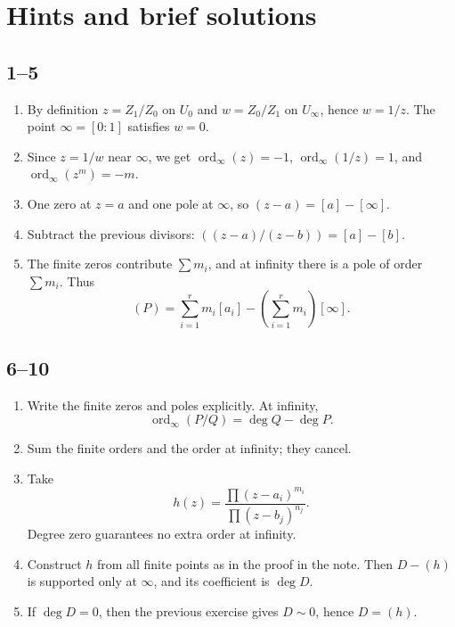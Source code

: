 \documentclass[11pt]{article}
\newcommand{\ord}{\operatorname{ord}}
\newcommand{\degd}{\operatorname{deg}}
\theoremstyle{definition}
\theoremstyle{plain}
\begin{document}
\section{Hints and brief solutions}
\subsection*{1--5}
\begin{enumerate}[label=\textbf{\arabic*.}, leftmargin=2.5em]
    \item By definition $z=Z_1/Z_0$ on $U_0$ and $w=Z_0/Z_1$ on $U_\infty$, hence $w=1/z$. The point $\infty=[0:1]$ satisfies $w=0$.
    \item Since $z=1/w$ near $\infty$, we get $\ord_{\infty}(z)=-1$, $\ord_{\infty}(1/z)=1$, and $\ord_{\infty}(z^m)=-m$.
    \item One zero at $z=a$ and one pole at $\infty$, so $(z-a)=[a]-[\infty]$.
    \item Subtract the previous divisors: $((z-a)/(z-b))=[a]-[b]$.
    \item The finite zeros contribute $\sum m_i$, and at infinity there is a pole of order $\sum m_i$. Thus
    \[
    (P)=\sum_{i=1}^r m_i[a_i]-\left(\sum_{i=1}^r m_i\right)[\infty].
    \]
\end{enumerate}

\subsection*{6--10}
\begin{enumerate}[label=\textbf{\arabic*.}, leftmargin=2.5em, start=6]
    \item Write the finite zeros and poles explicitly. At infinity,
    \[
    \ord_{\infty}(P/Q)=\deg Q-\deg P.
    \]
    \item Sum the finite orders and the order at infinity; they cancel.
    \item Take
    \[
    h(z)=\frac{\prod (z-a_i)^{m_i}}{\prod (z-b_j)^{n_j}}.
    \]
    Degree zero guarantees no extra order at infinity.
    \item Construct $h$ from all finite points as in the proof in the note. Then $D-(h)$ is supported only at $\infty$, and its coefficient is $\degd D$.
    \item If $\degd D=0$, then the previous exercise gives $D\sim 0$, hence $D=(h)$.
\end{enumerate}
\end{document}
